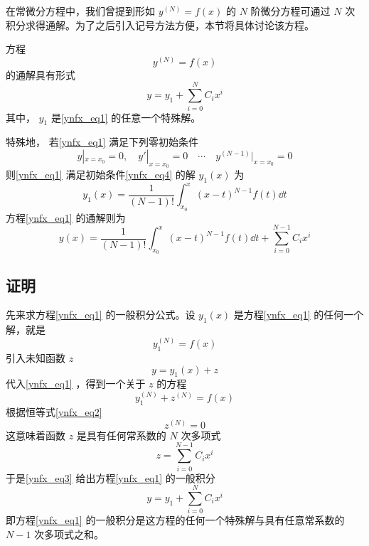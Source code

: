 
在常微分方程中，我们曾提到形如 $y^{(N)}=f(x)$ 的 $N$ 阶微分方程可通过 $N$ 次积分求得通解。为了之后引入记号方法方便，本节将具体讨论该方程。

方程
\begin{equation}\label{ynfx_eq1}
y^{(N)}=f(x)
\end{equation}
的通解具有形式
\begin{equation}\label{ynfx_eq7}
y=y_1+\sum_{i=0}^{N}C_ix^i
\end{equation}
其中， $y_1$ 是\autoref{ynfx_eq1} 的任意一个特殊解。

特殊地， 若\autoref{ynfx_eq1} 满足下列零初始条件
\begin{equation}\label{ynfx_eq4}
y|_{x=x_0}=0,\quad y'|_{x=x_0}=0\quad\cdots \quad y^{(N-1)}|_{x=x_0}=0
\end{equation}
则\autoref{ynfx_eq1} 满足初始条件\autoref{ynfx_eq4} 的解 $y_1(x)$ 为
\begin{equation}\label{ynfx_eq5}
y_1(x)=\frac{1}{(N-1)!}\int_{x_0}^x(x-t)^{N-1}f(t)\dd t
\end{equation}
方程\autoref{ynfx_eq1} 的通解则为
\begin{equation}
y(x)=\frac{1}{(N-1)!}\int_{x_0}^x(x-t)^{N-1}f(t)\dd t+\sum_{i=0}^{N-1}C_ix^i
\end{equation}
\subsection{证明}
先来求方程\autoref{ynfx_eq1} 的一般积分公式。设 $y_1(x)$ 是方程\autoref{ynfx_eq1} 的任何一个解，就是
\begin{equation}\label{ynfx_eq2}
y_1^{(N)}=f(x)
\end{equation}
引入未知函数 $z$
\begin{equation}\label{ynfx_eq3}
y=y_1(x)+z
\end{equation}
代入\autoref{ynfx_eq1} ，得到一个关于 $z$ 的方程
\begin{equation}
y_1^{(N)}+z^{(N)}=f(x)
\end{equation}
根据恒等式\autoref{ynfx_eq2} 
\begin{equation}
z^{(N)}=0
\end{equation}
这意味着函数 $z$ 是具有任何常系数的 $N$ 次多项式
\begin{equation}
z=\sum_{i=0}^{N-1}C_ix^i
\end{equation}
于是\autoref{ynfx_eq3} 给出方程\autoref{ynfx_eq1} 的一般积分
\begin{equation}
y=y_1+\sum_{i=0}^{N}C_ix^i
\end{equation}
即方程\autoref{ynfx_eq1} 的一般积分是这方程的任何一个特殊解与具有任意常系数的 $N-1$ 次多项式之和。


